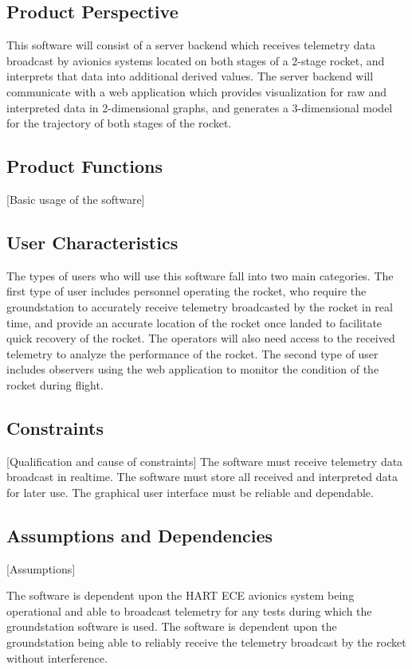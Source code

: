 \documentclass[onecolumn, draftclsnofoot,10pt, compsoc]{IEEEtran}
\begin{document}
		\subsection{Product Perspective}
			This software will consist of a server backend which receives telemetry data broadcast by avionics systems located on both stages of a 2-stage rocket, and interprets that data into additional derived values. 
			The server backend will communicate with a web application which provides visualization for raw and interpreted data in 2-dimensional graphs, and generates a 3-dimensional model for the trajectory of both stages of the rocket.

		\subsection{Product Functions}
			[Basic usage of the software]

		\subsection{User Characteristics}
			The types of users who will use this software fall into two main categories. 
			The first type of user includes personnel operating the rocket, who require the groundstation to accurately receive telemetry broadcasted by the rocket in real time, and provide an accurate location of the rocket once landed to facilitate quick recovery of the rocket.
			The operators will also need access to the received telemetry to analyze the performance of the rocket.
			The second type of user includes observers using the web application to monitor the condition of the rocket during flight.

		\subsection{Constraints}
			[Qualification and cause of constraints]
			The software must receive telemetry data broadcast in realtime.
			The software must store all received and interpreted data for later use.
			The graphical user interface must be reliable and dependable.

		\subsection{Assumptions and Dependencies}
			[Assumptions]

			\noindent The software is dependent upon the HART ECE avionics system being operational and able to broadcast telemetry for any tests during which the groundstation software is used.
			The software is dependent upon the groundstation being able to reliably receive the telemetry broadcast by the rocket without interference.
\end{document}
